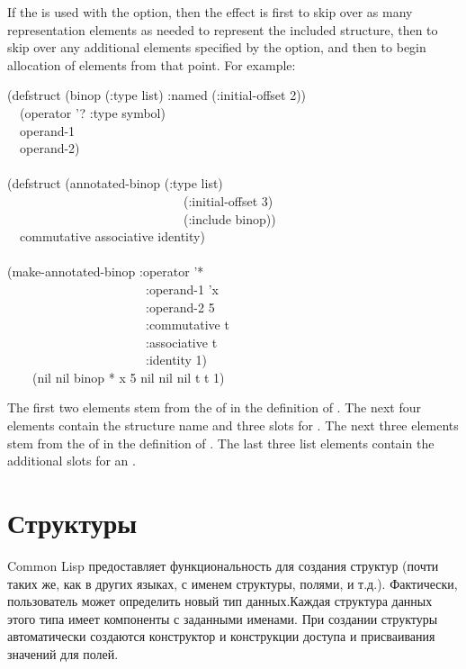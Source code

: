 If the  is used with the 
option, then the effect is first to skip over as many representation
elements as needed to represent the included structure, then to
skip over any additional elements specified by the 
option, and then to begin allocation of elements from that point.
For example:
\begin{lisp}
(defstruct (binop (:type list) :named (:initial-offset 2)) \\
~~(operator '? :type symbol) \\
~~operand-1 \\
~~operand-2) \\
 \\
(defstruct (annotated-binop (:type list) \\
~~~~~~~~~~~~~~~~~~~~~~~~~~~~(:initial-offset 3) \\
~~~~~~~~~~~~~~~~~~~~~~~~~~~~(:include binop)) \\
~~commutative associative identity) \\
 \\
(make-annotated-binop :operator '* \\
~~~~~~~~~~~~~~~~~~~~~~:operand-1 'x \\
~~~~~~~~~~~~~~~~~~~~~~:operand-2 5 \\
~~~~~~~~~~~~~~~~~~~~~~:commutative t \\
~~~~~~~~~~~~~~~~~~~~~~:associative t \\
~~~~~~~~~~~~~~~~~~~~~~:identity 1) \\
~~~\EV\ (nil nil binop * x 5 nil nil nil t t 1)
\end{lisp}
The first two {\nil} elements stem from the  of 
in the definition of .  The next four elements contain the
structure name and three slots for .  The next three {\nil} elements
stem from the  of  in the definition of
.  The last three list elements contain the additional
slots for an .

\else

\chapter{Структуры}

Common Lisp предоставляет функциональность для создания структур (почти таких
же, как в других языках, с именем структуры, полями, и т.д.). Фактически,
пользователь может определить новый тип данных.Каждая структура данных
этого типа имеет компоненты с заданными именами.
При создании структуры автоматически создаются конструктор и конструкции доступа
и присваивания значений для полей.

